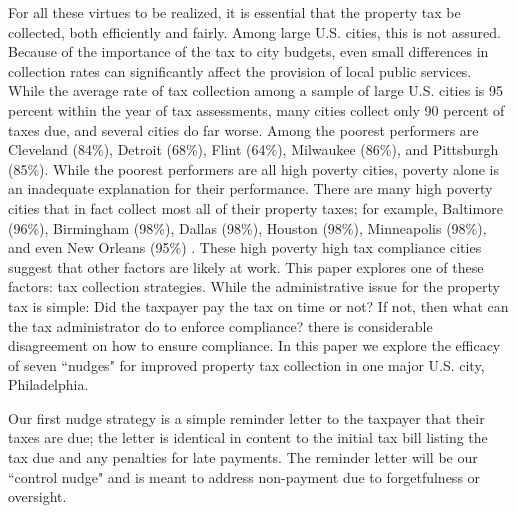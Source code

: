 \documentclass[12pt]{article}
\begin{document}
For all these virtues to be realized, it is essential that the
property tax be collected, both efficiently and fairly.  Among large
U.S. cities, this is not assured.  Because of the importance of the
tax to city budgets, even small differences in collection rates can
significantly affect the provision of local public services. While the
average rate of tax collection among a sample of large U.S. cities is
95 percent within the year of tax assessments, many cities collect
only 90 percent of taxes due, and several cities do far worse.  Among
the poorest performers are Cleveland (84\%), Detroit (68\%), Flint
(64\%), Milwaukee (86\%), and Pittsburgh (85\%). While the poorest
performers are all high poverty cities, poverty alone is an inadequate
explanation for their performance. There are many high poverty cities
that in fact collect most all of their property taxes; for example,
Baltimore (96\%), Birmingham (98\%), Dallas (98\%), Houston (98\%),
Minneapolis (98\%), and even New Orleans (95\%) \cite{CILMS-16}.
These high poverty high tax compliance cities suggest that other
factors are likely at work.  This paper explores one of these factors:
tax collection strategies. While the administrative issue for the
property tax is simple: Did the taxpayer pay the tax on time or not?
If not, then what can the tax administrator do to enforce compliance?
there is considerable disagreement on how to ensure compliance. In
this paper we explore the efficacy of seven ``nudges" for improved
property tax collection in one major U.S. city, Philadelphia.

Our first nudge strategy is a simple reminder letter to the taxpayer
that their taxes are due; the letter is identical in content to the
initial tax bill listing the tax due and  any penalties for late
payments.  The reminder letter will be our ``control nudge" and is
meant to address non-payment due to forgetfulness or oversight.
\end{document}

